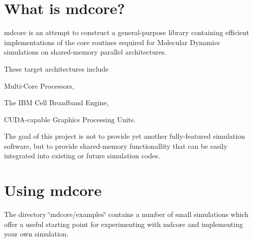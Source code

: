 \hypertarget{index_sec_whatis}{}\section{What is mdcore?}\label{index_sec_whatis}
mdcore is an attempt to construct a general-\/purpose library containing efficient implementations of the core routines required for Molecular Dynamics simulations on shared-\/memory parallel architectures.

These target architectures include

\begin{DoxyItemize}
\item Multi-\/\-Core Processors, \item The I\-B\-M Cell Broadband Engine, \item C\-U\-D\-A-\/capable Graphics Processing Units.\end{DoxyItemize}
The goal of this project is not to provide yet another fully-\/featured simulation software, but to provide shared-\/memory functionallity that can be easily integrated into existing or future simulation codes.\hypertarget{index_sec_using}{}\section{Using mdcore}\label{index_sec_using}
The directory \char`\"{}mdcore/examples\char`\"{} contains a number of small simulations which offer a useful starting point for experimenting with mdcore and implementing your own simulation. 
